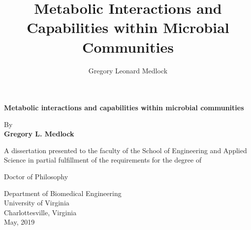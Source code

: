 \documentclass[11pt,twocolumn,notitlepage,openany,twoside]{book}
\title{Metabolic Interactions and Capabilities within Microbial Communities}
\author{Gregory Leonard Medlock}
\begin{document}
\frontmatter

\clearpage
\begin{titlepage}
   \begin{center}
       \vspace*{1cm}

       \LARGE
       \textbf{Metabolic interactions and capabilities within microbial communities}


       \vspace{1.5cm}

       \Large
       By\\
       \textbf{Gregory L. Medlock}

       \vspace{2.5cm}

       A dissertation presented to the faculty of the School of Engineering and Applied Science in partial fulfillment of the requirements for the degree of\\

       \vspace{1.5cm}

       Doctor of Philosophy

       \vspace{1.5cm}

       Department of Biomedical Engineering\\
       University of Virginia\\
       Charlottesville, Virginia\\
       May, 2019

   \end{center}
\end{titlepage}

\clearpage
\onecolumn
\end{document}
